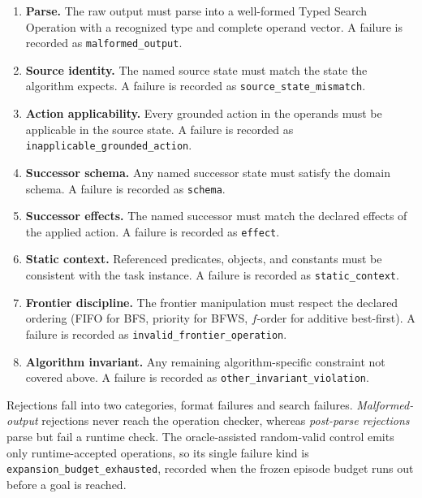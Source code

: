 \begin{enumerate}[leftmargin=*, itemsep=1pt, parsep=1pt]
\item \textbf{Parse.} The raw output must parse into a well-formed Typed Search Operation with a recognized type and complete operand vector. A failure is recorded as \texttt{malformed\_output}.
\item \textbf{Source identity.} The named source state must match the state the algorithm expects. A failure is recorded as \texttt{source\_state\_mismatch}.
\item \textbf{Action applicability.} Every grounded action in the operands must be applicable in the source state. A failure is recorded as \texttt{inapplicable\_grounded\_action}.
\item \textbf{Successor schema.} Any named successor state must satisfy the domain schema. A failure is recorded as \texttt{schema}.
\item \textbf{Successor effects.} The named successor must match the declared effects of the applied action. A failure is recorded as \texttt{effect}.
\item \textbf{Static context.} Referenced predicates, objects, and constants must be consistent with the task instance. A failure is recorded as \texttt{static\_context}.
\item \textbf{Frontier discipline.} The frontier manipulation must respect the declared ordering (FIFO for BFS, priority for BFWS, $f$-order for additive best-first). A failure is recorded as \texttt{invalid\_frontier\_operation}.
\item \textbf{Algorithm invariant.} Any remaining algorithm-specific constraint not covered above. A failure is recorded as \texttt{other\_invariant\_violation}.
\end{enumerate}

Rejections fall into two categories, format failures and search failures. \emph{Malformed-output} rejections never reach the operation checker, whereas \emph{post-parse rejections} parse but fail a runtime check. The oracle-assisted random-valid control emits only runtime-accepted operations, so its single failure kind is \texttt{expansion\_budget\_exhausted}, recorded when the frozen episode budget runs out before a goal is reached.

